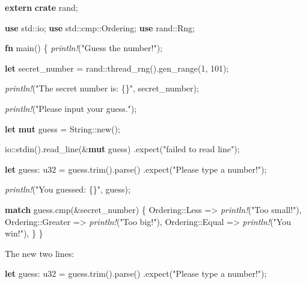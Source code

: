 \documentclass[a4paper,]{book}
\newenvironment{Shaded}{\begin{snugshade}}{\end{snugshade}}
\newcommand{\KeywordTok}[1]{\textcolor[rgb]{0.13,0.29,0.53}{\textbf{{#1}}}}
\newcommand{\DataTypeTok}[1]{\textcolor[rgb]{0.13,0.29,0.53}{{#1}}}
\newcommand{\DecValTok}[1]{\textcolor[rgb]{0.00,0.00,0.81}{{#1}}}
\newcommand{\StringTok}[1]{\textcolor[rgb]{0.31,0.60,0.02}{{#1}}}
\newcommand{\PreprocessorTok}[1]{\textcolor[rgb]{0.56,0.35,0.01}{\textit{{#1}}}}
\newcommand{\NormalTok}[1]{{#1}}
\begin{document}
\begin{Shaded}
\begin{Highlighting}[]
\KeywordTok{extern} \KeywordTok{crate} \NormalTok{rand;}

\KeywordTok{use} \NormalTok{std::io;}
\KeywordTok{use} \NormalTok{std::cmp::Ordering;}
\KeywordTok{use} \NormalTok{rand::Rng;}

\KeywordTok{fn} \NormalTok{main() \{}
    \PreprocessorTok{println!}\NormalTok{(}\StringTok{"Guess the number!"}\NormalTok{);}

    \KeywordTok{let} \NormalTok{secret_number = rand::thread_rng().gen_range(}\DecValTok{1}\NormalTok{, }\DecValTok{101}\NormalTok{);}

    \PreprocessorTok{println!}\NormalTok{(}\StringTok{"The secret number is: \{\}"}\NormalTok{, secret_number);}

    \PreprocessorTok{println!}\NormalTok{(}\StringTok{"Please input your guess."}\NormalTok{);}

    \KeywordTok{let} \KeywordTok{mut} \NormalTok{guess = }\DataTypeTok{String}\NormalTok{::new();}

    \NormalTok{io::stdin().read_line(&}\KeywordTok{mut} \NormalTok{guess)}
        \NormalTok{.expect(}\StringTok{"failed to read line"}\NormalTok{);}

    \KeywordTok{let} \NormalTok{guess: }\DataTypeTok{u32} \NormalTok{= guess.trim().parse()}
        \NormalTok{.expect(}\StringTok{"Please type a number!"}\NormalTok{);}

    \PreprocessorTok{println!}\NormalTok{(}\StringTok{"You guessed: \{\}"}\NormalTok{, guess);}

    \KeywordTok{match} \NormalTok{guess.cmp(&secret_number) \{}
        \NormalTok{Ordering::Less    => }\PreprocessorTok{println!}\NormalTok{(}\StringTok{"Too small!"}\NormalTok{),}
        \NormalTok{Ordering::Greater => }\PreprocessorTok{println!}\NormalTok{(}\StringTok{"Too big!"}\NormalTok{),}
        \NormalTok{Ordering::Equal   => }\PreprocessorTok{println!}\NormalTok{(}\StringTok{"You win!"}\NormalTok{),}
    \NormalTok{\}}
\NormalTok{\}}
\end{Highlighting}
\end{Shaded}

The new two lines:

\begin{Shaded}
\begin{Highlighting}[]
    \KeywordTok{let} \NormalTok{guess: }\DataTypeTok{u32} \NormalTok{= guess.trim().parse()}
        \NormalTok{.expect(}\StringTok{"Please type a number!"}\NormalTok{);}
\end{Highlighting}
\end{Shaded}
\end{document}
